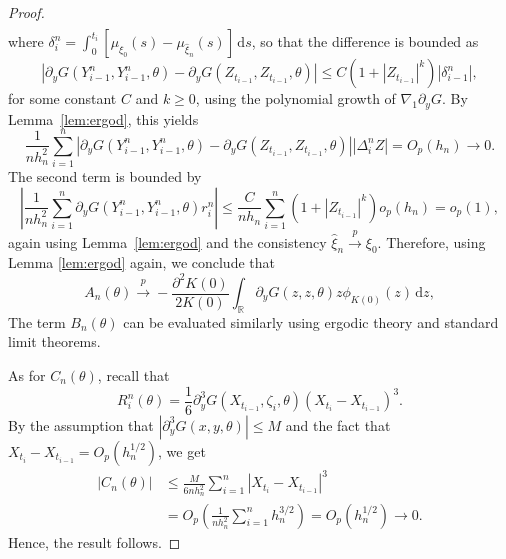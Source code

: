 \documentclass[10pt,a4paper]{amsart}
\def\R{\mathbb{R}}
\def\d{\delta}
\def\df{\mathrm{d}}
\def\l{\left}
\def\p{\partial}
\def\r{\right}
\def\toP{\stackrel{p}{\longrightarrow}}
\def\wh#1{\widehat{#1}}
\begin{document}
\begin{proof}
\begin{align*}
\end{align*}
where $\d_i^n = \int_0^{t_i} [\mu_{\xi_0}(s) - \mu_{\wh{\xi}_n}(s)]\,\df s$, so that the difference is bounded as
\[
\l| \p_y G(Y_{i-1}^n, Y_{i-1}^n, \theta) - \p_y G(Z_{t_{i-1}}, Z_{t_{i-1}}, \theta) \r| \le C(1 + |Z_{t_{i-1}}|^k) |\delta_{i-1}^n|,
\]
for some constant \( C \) and \( k \ge 0 \), using the polynomial growth of \( \nabla_1 \p_y G \).
By Lemma~\ref{lem:ergod}, this yields
\[
\frac{1}{n h_n^2} \sum_{i=1}^n \l| \p_y G(Y_{i-1}^n, Y_{i-1}^n, \theta) - \p_y G(Z_{t_{i-1}}, Z_{t_{i-1}}, \theta) \r| |\Delta_i^n Z| = O_p(h_n) \to 0.
\]
The second term is bounded by
\[
\l| \frac{1}{n h_n^2} \sum_{i=1}^n \p_y G(Y_{i-1}^n, Y_{i-1}^n, \theta) r_i^n \r| \le \frac{C}{n h_n} \sum_{i=1}^n (1 + |Z_{t_{i-1}}|^k) o_p(h_n)= o_p(1),
\]
again using Lemma~\ref{lem:ergod} and the consistency \( \wh{\xi}_n \toP \xi_0 \).
Therefore,  using Lemma \ref{lem:ergod} again, we conclude that 
\[
A_n(\theta) \toP -\frac{\p^2 K(0)}{2K(0)} \int_{\R} \p_y G(z, z, \theta) z \phi_{K(0)}(z)\,\df z, 
\]
The term $B_n(\theta)$ can be evaluated similarly using ergodic theory and standard limit theorems.

As for $C_n(\theta)$, recall that
\[
R_i^n(\theta) = \frac{1}{6} \p_y^3 G\l(X_{t_{i-1}}, \zeta_i, \theta \r) (X_{t_i} - X_{t_{i-1}})^3.
\]
By the assumption that $|\p_y^3 G(x,y,\theta)| \le M$ and the fact that $X_{t_i} - X_{t_{i-1}} = O_p(h_n^{1/2})$, we get
\begin{align*}
|C_n(\theta)| &\le \frac{M}{6 n h_n^2} \sum_{i=1}^n |X_{t_i} - X_{t_{i-1}}|^3 \\
&= O_p\l(\frac{1}{n h_n^2} \sum_{i=1}^n h_n^{3/2} \r) = O_p(h_n^{1/2}) \to 0.
\end{align*}
Hence, the result follows. 
\end{proof}
\end{document}

